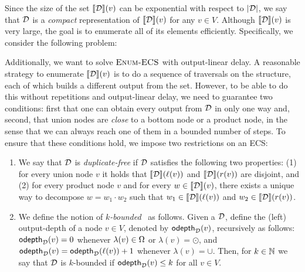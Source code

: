 Since the size of the set ${\llbracket{\mathcal{D}}\rrbracket}(v)$ can be exponential with respect to $|\mathcal{D}|$, we say that $\mathcal{D}$ is a \emph{compact} representation of ${\llbracket{\mathcal{D}}\rrbracket}(v)$ for any $v \in V$.
Although ${\llbracket{\mathcal{D}}\rrbracket}(v)$ is very large, the goal is to enumerate all of its elements efficiently. Specifically, we consider the following problem:
\begin{center}
\end{center}
\vspace{.1cm}
Additionally, we want to solve $\textsc{Enum-ECS}$ with output-linear delay. 
A reasonable strategy to enumerate ${\llbracket{\mathcal{D}}\rrbracket}(v)$ is to do a sequence of traversals on the structure, each of which builds a different output from the set. 
However, to be able to do this without repetitions and output-linear delay, we need to guarantee two conditions: first that one can obtain every output from $\mathcal{D}$ in only one way and, second, that union nodes are {\it close} to a bottom node or a product node, in the sense that we can always reach one of them in a bounded number of steps. To ensure that these conditions hold, we impose two restrictions on an ECS:
\begin{enumerate}
	\item We say that $\mathcal{D}$ is \emph{duplicate-free} if $\mathcal{D}$ satisfies the following two properties: (1) for every union node $v$ it holds that ${\llbracket{\mathcal{D}}\rrbracket}(\ell(v))$ and ${\llbracket{\mathcal{D}}\rrbracket}(r(v))$ are disjoint, and (2) for every product node $v$ and for every $w \in {\llbracket{\mathcal{D}}\rrbracket}(v)$, there exists a unique way to decompose $w = w_1 \cdot w_2$ such that $w_1 \in {\llbracket{\mathcal{D}}\rrbracket}(\ell(v))$ and $w_2 \in {\llbracket{\mathcal{D}}\rrbracket}(r(v))$. 
	
	\item We define the notion of \emph{$k$-bounded}~\dsabbr{} as follows. 
	Given a \dsabbr{} $\mathcal{D}$, define the (left) output-depth of a node $v\in V$, denoted by $\mathsf{odepth}_{\mathcal{D}}(v)$, recursively as follows:
	$\mathsf{odepth}_{\mathcal{D}}(v) = 0$ whenever $\lambda(v)\in\Omega$ or $\lambda(v) = \odot$, and $\mathsf{odepth}_{\mathcal{D}}(v) = \mathsf{odepth}_{\mathcal{D}}(\ell(v))+1$ whenever $\lambda(v) = \cup$.
	Then, for $k\in\mathbb{N}$ we say that $\mathcal{D}$ is $k$-bounded if $\mathsf{odepth}_{\mathcal{D}}(v)\leq k$ for all $v\in V$.
\end{enumerate}




